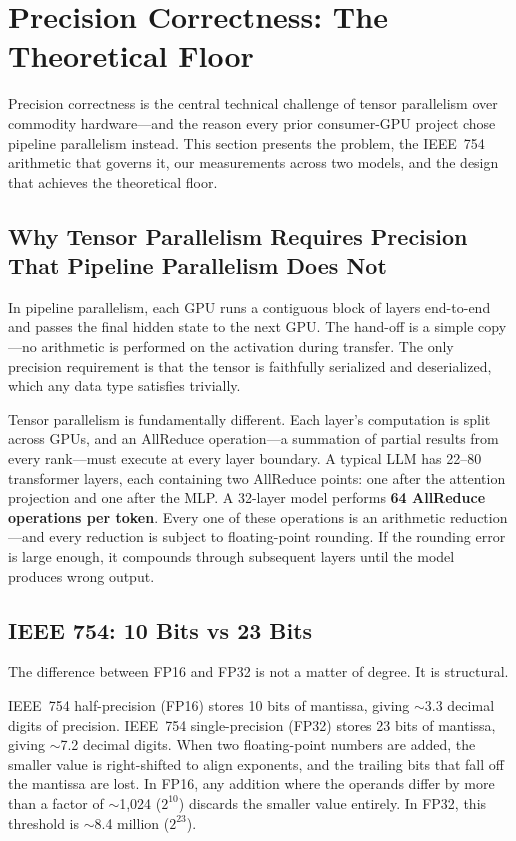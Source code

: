 \documentclass[10pt,twocolumn]{article}
\begin{document}
\section{Precision Correctness: The Theoretical Floor}\label{sec:precision}

Precision correctness is the central technical challenge of tensor
parallelism over commodity hardware---and the reason every prior
consumer-GPU project chose pipeline parallelism instead.  This section
presents the problem, the IEEE~754 arithmetic that governs it, our
measurements across two models, and the design that achieves the
theoretical floor.

\subsection{Why Tensor Parallelism Requires Precision That Pipeline Parallelism Does Not}\label{sec:prec-why}

In pipeline parallelism, each GPU runs a contiguous block of layers
end-to-end and passes the final hidden state to the next GPU\@.  The
hand-off is a simple copy---no arithmetic is performed on the activation
during transfer.  The only precision requirement is that the tensor is
faithfully serialized and deserialized, which any data type satisfies
trivially.

Tensor parallelism is fundamentally different.  Each layer's computation
is split across GPUs, and an AllReduce operation---a summation of partial
results from every rank---must execute at every layer boundary.  A typical
LLM has 22--80 transformer layers, each containing two AllReduce points:
one after the attention projection and one after the MLP\@.  A 32-layer
model performs \textbf{64 AllReduce operations per token}.  Every one of
these operations is an arithmetic reduction---and every reduction is
subject to floating-point rounding.  If the rounding error is large
enough, it compounds through subsequent layers until the model produces
wrong output.

\subsection{IEEE 754: 10 Bits vs 23 Bits}\label{sec:prec-ieee}

The difference between FP16 and FP32 is not a matter of degree.  It is
structural.

IEEE~754 half-precision (FP16) stores 10 bits of mantissa, giving
$\sim$3.3 decimal digits of precision.  IEEE~754 single-precision (FP32)
stores 23 bits of mantissa, giving $\sim$7.2 decimal digits.  When two
floating-point numbers are added, the smaller value is right-shifted to
align exponents, and the trailing bits that fall off the mantissa are lost.
In FP16, any addition where the operands differ by more than a factor of
$\sim$1,024 ($2^{10}$) discards the smaller value entirely.  In FP32,
this threshold is $\sim$8.4 million ($2^{23}$).
\end{document}

